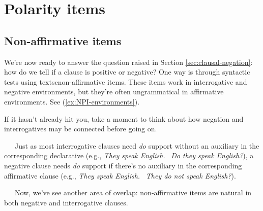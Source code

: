 \section{Polarity items} \label{sec:polarity-items}

\subsection{Non-affirmative items}

We're now ready to answer the question raised in Section \ref{sec:clausal-negation}: how do we tell if a clause is positive or negative? One way is through syntactic tests using textsc{non-affirmative items}. These items work in interrogative and negative environments, but they're often ungrammatical in affirmative environments. See (\ref{ex:NPI-environments}).

\ea \label{ex:NPI-environments}
    \ea
         \label{ex:at-all-interrogative}
         \label{ex:at-all-neg}
         \label{ex:at-all-pos}
        \z
    \ex
         \label{ex:ever-interrogative}
         \label{ex:ever-neg}
         \label{ex:ever-pos}
        \z
    \ex
         \label{ex:yet-interrogative}
         \label{ex:yet-neg}
         \label{ex:yet-pos}
        \z
    \z
\z

\begin{tcolorbox}[title=Overlap between interrogatives and negatives, colback=white]
    If it hasn't already hit you, take a moment to think about how negation and interrogatives may be connected before going on.

    ~~~Just as most interrogative clauses need \textit{do} support without an auxiliary in the corresponding declarative (e.g., \textit{They speak English.} \rightarrow ~\textit{Do they speak English?}), a negative clause needs \textit{do} support if there's no auxiliary in the corresponding affirmative clause (e.g., \textit{They speak English.} \rightarrow ~\textit{They do not speak English?}).

    ~~~Now, we've see another area of overlap: non-affirmative items are natural in both negative and interrogative clauses.
\end{tcolorbox}

